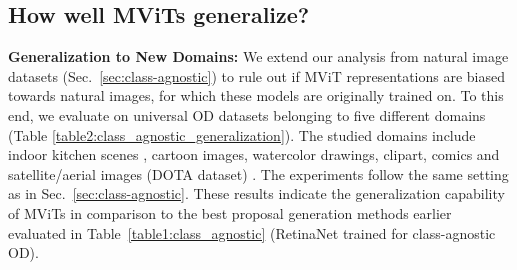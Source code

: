 \documentclass[runningheads]{llncs}
\begin{document}
\begin{table}[!t]
\caption{\small Class-agnostic OD performance of \colorbox{orange!6}{MViTs} in comparison with RetinaNet \cite{lin2017focal} on several out-of-domain datasets. MViTs show consistently good results on all datasets.  $^{\dagger}$Proposals on DOTA \cite{dota} are generated by multi-scale inference (see Sec.~\ref{appendix:class_agnostic_evaluation}).}
\begin{center}
\setlength{\tabcolsep}{6pt}
\end{center}
\label{table2:class_agnostic_generalization}
\end{table}

\subsection{How well MViTs generalize?}

\noindent \textbf{Generalization to New Domains:}
We extend our analysis from natural image datasets (Sec.~\ref{sec:class-agnostic}) to rule out if MViT representations are biased towards natural images, for which these models are originally trained on. To this end, we evaluate on universal OD datasets \cite{universal} belonging to five different domains (Table \ref{table2:class_agnostic_generalization}). The studied domains include indoor kitchen scenes \cite{kitchen}, cartoon images, watercolor drawings, clipart, comics \cite{clipart-comic-water} and satellite/aerial images (DOTA dataset) \cite{dota}. The experiments follow the same setting as in Sec.~\ref{sec:class-agnostic}. These results indicate the generalization capability of MViTs in comparison to the best proposal generation methods earlier evaluated in Table~\ref{table1:class_agnostic} (RetinaNet trained for class-agnostic OD).
\end{document}
